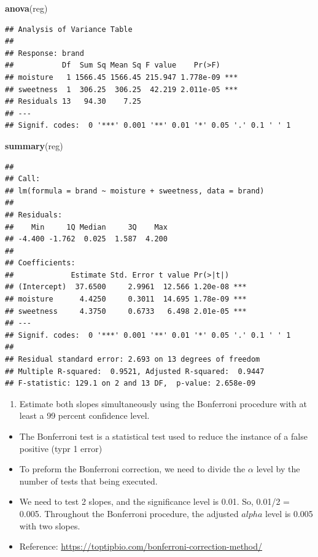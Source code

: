 \documentclass[
]{article}
\newenvironment{Shaded}{\begin{snugshade}}{\end{snugshade}}
\newcommand{\KeywordTok}[1]{\textcolor[rgb]{0.13,0.29,0.53}{\textbf{#1}}}
\newcommand{\NormalTok}[1]{#1}
\providecommand{\tightlist}{%
  \setlength{\itemsep}{0pt}\setlength{\parskip}{0pt}}
\begin{document}
\begin{Shaded}
\begin{Highlighting}[]
\KeywordTok{anova}\NormalTok{(reg)}
\end{Highlighting}
\end{Shaded}

\begin{verbatim}
## Analysis of Variance Table
## 
## Response: brand
##           Df  Sum Sq Mean Sq F value    Pr(>F)    
## moisture   1 1566.45 1566.45 215.947 1.778e-09 ***
## sweetness  1  306.25  306.25  42.219 2.011e-05 ***
## Residuals 13   94.30    7.25                      
## ---
## Signif. codes:  0 '***' 0.001 '**' 0.01 '*' 0.05 '.' 0.1 ' ' 1
\end{verbatim}

\begin{Shaded}
\begin{Highlighting}[]
\KeywordTok{summary}\NormalTok{(reg)}
\end{Highlighting}
\end{Shaded}

\begin{verbatim}
## 
## Call:
## lm(formula = brand ~ moisture + sweetness, data = brand)
## 
## Residuals:
##    Min     1Q Median     3Q    Max 
## -4.400 -1.762  0.025  1.587  4.200 
## 
## Coefficients:
##             Estimate Std. Error t value Pr(>|t|)    
## (Intercept)  37.6500     2.9961  12.566 1.20e-08 ***
## moisture      4.4250     0.3011  14.695 1.78e-09 ***
## sweetness     4.3750     0.6733   6.498 2.01e-05 ***
## ---
## Signif. codes:  0 '***' 0.001 '**' 0.01 '*' 0.05 '.' 0.1 ' ' 1
## 
## Residual standard error: 2.693 on 13 degrees of freedom
## Multiple R-squared:  0.9521, Adjusted R-squared:  0.9447 
## F-statistic: 129.1 on 2 and 13 DF,  p-value: 2.658e-09
\end{verbatim}

\begin{enumerate}
\def\labelenumi{(\alph{enumi})}
\setcounter{enumi}{5}
\tightlist
\item
  Estimate both slopes simultaneously using the Bonferroni procedure
  with at least a 99 percent confidence level.
\end{enumerate}

\begin{itemize}
\tightlist
\item
  The Bonferroni test is a statistical test used to reduce the instance
  of a false positive (typr 1 error)
\item
  To preform the Bonferroni correction, we need to divide the \(\alpha\)
  level by the number of tests that being executed.
\item
  We need to test 2 slopes, and the significance level is 0.01. So,
  0.01/2 = 0.005. Throughout the Bonferroni procedure, the adjusted
  \(alpha\) level is 0.005 with two slopes.
\item
  Reference: \url{https://toptipbio.com/bonferroni-correction-method/}
\end{itemize}
\end{document}
